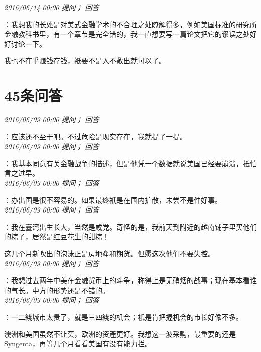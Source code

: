\documentclass[twocolumn]{ctexart}
\begin{document}
\textit{\hfill\noindent\small 2016/06/14 00:00 提问； 回答}

：我想我的长处是对美式金融学术的不合理之处瞭解得多，例如美国标准的研究所金融教科书里，有一个章节是完全错的，我一直想要写一篇论文把它的谬误之处好好讨论一下。

我也不在乎赚钱存钱，衹要不是入不敷出就可以了。\\

\section{45条问答}

\textit{\hfill\noindent\small 2016/06/09 00:00 提问； 回答}

：应该还不至于吧。不过危险是现实存在，我就提了一提。\\

\textit{\hfill\noindent\small 2016/06/09 00:00 提问； 回答}

：我基本同意有关金融战争的描述，但是他凭一个数据就说美国已经要崩溃，衹怕言之过早。\\

\textit{\hfill\noindent\small 2016/06/09 00:00 提问； 回答}

：办出国是很不容易的。如果最终衹是在国内扩散，未尝不是件好事。\\

\textit{\hfill\noindent\small 2016/06/09 00:00 提问； 回答}

：我在臺湾出生长大，当然是咸党。奇怪的是，我前天到附近的越南铺子里买他们的粽子，居然是红豆花生的甜粽！

这几个月新吹出的泡沫正是房地產和期货。但愿这次他们不要失控。\\

\textit{\hfill\noindent\small 2016/06/09 00:00 提问； 回答}

：我想过去两年中美在金融货币上的斗争，称得上是无硝烟的战事；现在基本看谁的气长。中方的形势还是不错的。\\

\textit{\hfill\noindent\small 2016/06/09 00:00 提问； 回答}

：一二綫城市太贵了，就是三四綫的机会；衹是肯把握机会的市长好像不多。

澳洲和美国虽然不让买，欧洲的资產更好。我想这一波采购，最重要的还是Syngenta，再等几个月看看美国有没有能力拦。\\
\end{document}
